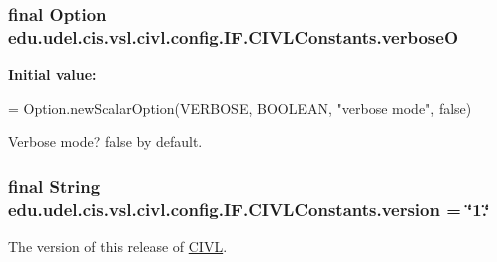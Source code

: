 \subsubsection[{verbose\+O}]{\setlength{\rightskip}{0pt plus 5cm}final Option edu.\+udel.\+cis.\+vsl.\+civl.\+config.\+I\+F.\+C\+I\+V\+L\+Constants.\+verbose\+O\hspace{0.3cm}{\ttfamily [static]}}\label{classedu_1_1udel_1_1cis_1_1vsl_1_1civl_1_1config_1_1IF_1_1CIVLConstants_a4ddd080c8bf9bf33ef356eaa13390a9e}
{\bfseries Initial value\+:}
\begin{DoxyCode}
= Option.newScalarOption(VERBOSE,
            BOOLEAN, \textcolor{stringliteral}{"verbose mode"}, \textcolor{keyword}{false})
\end{DoxyCode}


Verbose mode? false by default. 

\hypertarget{classedu_1_1udel_1_1cis_1_1vsl_1_1civl_1_1config_1_1IF_1_1CIVLConstants_ac0c7fff17695b5ca83703765a4fa2f53}{}
\subsubsection[{version}]{\setlength{\rightskip}{0pt plus 5cm}final String edu.\+udel.\+cis.\+vsl.\+civl.\+config.\+I\+F.\+C\+I\+V\+L\+Constants.\+version = \char`\"{}1.\char`\"{}\hspace{0.3cm}{\ttfamily [static]}}\label{classedu_1_1udel_1_1cis_1_1vsl_1_1civl_1_1config_1_1IF_1_1CIVLConstants_ac0c7fff17695b5ca83703765a4fa2f53}


The version of this release of \hyperlink{classedu_1_1udel_1_1cis_1_1vsl_1_1civl_1_1CIVL}{C\+I\+V\+L}. 

\hypertarget{classedu_1_1udel_1_1cis_1_1vsl_1_1civl_1_1config_1_1IF_1_1CIVLConstants_a04157ad0ddb32229565aa679373a5039}{}
